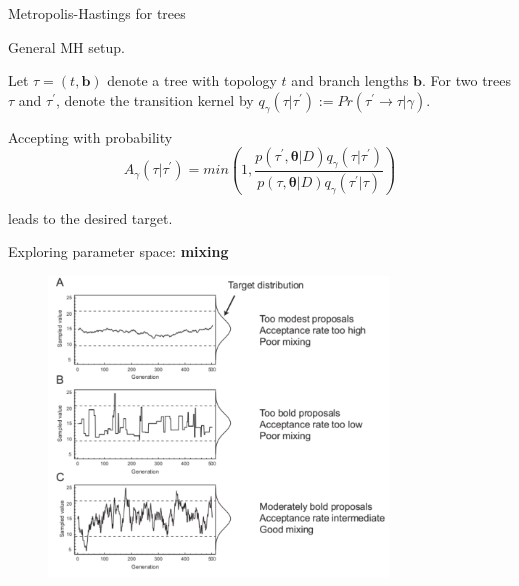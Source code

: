 \documentclass[newPxFont,numfooter,sectionpages]{beamer}
\begin{document}
\begin{frame}{Metropolis-Hastings for trees}

General MH setup.

Let $\tau = (t, \boldsymbol b)$ denote a tree with topology $t$ and branch lengths $\boldsymbol b$. 
For two trees $\tau$ and $\tau^\prime$, denote  the transition kernel by $q_{\gamma}(\tau| \tau^\prime) := Pr(\tau^\prime \rightarrow \tau | \gamma)$.

Accepting with probability
\[ A_{\gamma}(\tau | \tau^\prime) = min\left(1, \frac{ p(\tau^\prime, \boldsymbol \theta | D)q_{\gamma}(\tau|\tau^\prime)}{p(\tau, \boldsymbol \theta | D)q_{\gamma}(\tau^\prime|\tau)}\right) \]

leads to the desired target.

\end{frame}

\begin{frame}{Exploring parameter space: \textbf{mixing}}
\begin{figure}
	\includegraphics[width=\textwidth,height=8cm]{figures/mixing.pdf} 
\end{figure}
\end{frame}
\end{document}
